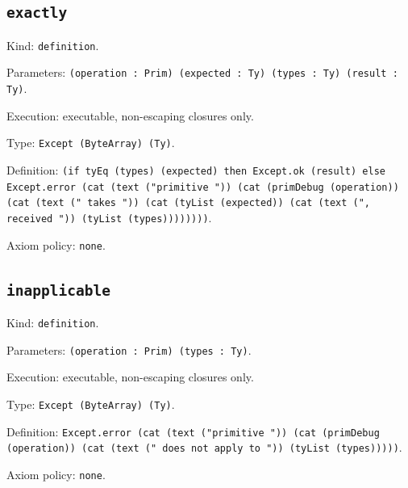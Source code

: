 \documentclass[11pt]{article}
\begin{document}
\subsection*{\texttt{exactly}}
\noindent Kind: \texttt{definition}.\par
\noindent Parameters: \texttt{(operation : Prim) (expected : Ty) (types : Ty) (result : Ty)}.\par
\noindent Execution: executable, non-escaping closures only.\par
\noindent Type: \texttt{Except (ByteArray) (Ty)}.\par
\noindent Definition: \texttt{(if tyEq (types) (expected) then Except.ok (result) else Except.error (cat (text ("primitive ")) (cat (primDebug (operation)) (cat (text (" takes ")) (cat (tyList (expected)) (cat (text (", received ")) (tyList (types))))))))}.\par
\noindent Axiom policy: \texttt{none}.\par
\subsection*{\texttt{inapplicable}}
\noindent Kind: \texttt{definition}.\par
\noindent Parameters: \texttt{(operation : Prim) (types : Ty)}.\par
\noindent Execution: executable, non-escaping closures only.\par
\noindent Type: \texttt{Except (ByteArray) (Ty)}.\par
\noindent Definition: \texttt{Except.error (cat (text ("primitive ")) (cat (primDebug (operation)) (cat (text (" does not apply to ")) (tyList (types)))))}.\par
\noindent Axiom policy: \texttt{none}.\par
\end{document}
